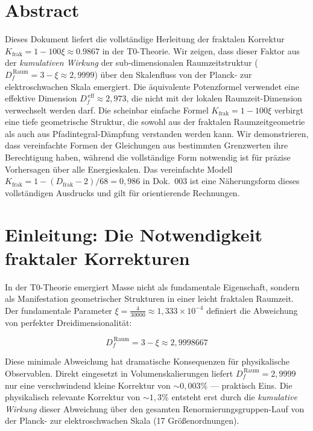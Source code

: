 \section*{Abstract}
		Dieses Dokument liefert die vollständige Herleitung der fraktalen Korrektur $K_{\text{frak}} = 1 - 100\xi \approx 0.9867$ in der T0-Theorie. Wir zeigen, dass dieser Faktor aus der \emph{kumulativen Wirkung} der sub-dimensionalen Raumzeitstruktur ($D_f^{\,\text{Raum}} = 3 - \xi \approx 2{,}9999$) über den Skalenfluss von der Planck- zur elektroschwachen Skala emergiert. Die äquivalente Potenzformel verwendet eine effektive Dimension $D_f^{\,\text{eff}} \approx 2{,}973$, die nicht mit der lokalen Raumzeit-Dimension verwechselt werden darf. Die scheinbar einfache Formel $K_{\text{frak}} = 1 - 100\xi$ verbirgt eine tiefe geometrische Struktur, die sowohl aus der fraktalen Raumzeitgeometrie als auch aus Pfadintegral-Dämpfung verstanden werden kann. Wir demonstrieren, dass vereinfachte Formen der Gleichungen aus bestimmten Grenzwerten ihre Berechtigung haben, während die vollständige Form notwendig ist für präzise Vorhersagen über alle Energieskalen. Das vereinfachte Modell $K_{\text{frak}} = 1 - (D_{\text{frak}}-2)/68 = 0{,}986$ in Dok.~003 ist eine Näherungsform dieses vollständigen Ausdrucks und gilt für orientierende Rechnungen.

	
	\setcounter{tocdepth}{3}  %
	
	\section{Einleitung: Die Notwendigkeit fraktaler Korrekturen}
	
	In der T0-Theorie emergiert Masse nicht als fundamentale Eigenschaft, sondern als Manifestation geometrischer Strukturen in einer leicht fraktalen Raumzeit. Der fundamentale Parameter $\xi = \frac{4}{30000} \approx 1{,}333 \times 10^{-4}$ definiert die Abweichung von perfekter Dreidimensionalität:
	
	\begin{equation}
		D_f^{\,\text{Raum}} = 3 - \xi \approx 2{,}9998667
		\label{eq:Df_def}
	\end{equation}
	
	Diese minimale Abweichung hat dramatische Konsequenzen für physikalische Observablen. Direkt eingesetzt in Volumenskalierungen liefert $D_f^{\,\text{Raum}} = 2{,}9999$ nur eine verschwindend kleine Korrektur von $\sim 0{,}003\%$ --- praktisch Eins. Die physikalisch relevante Korrektur von $\sim 1{,}3\%$ entsteht erst durch die \emph{kumulative Wirkung} dieser Abweichung über den gesamten Renormierungsgruppen-Lauf von der Planck- zur elektroschwachen Skala (17 Größenordnungen).
	
